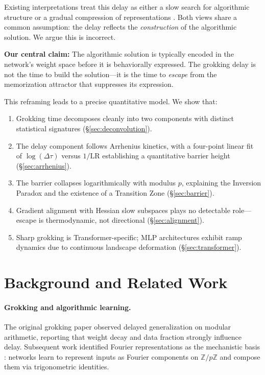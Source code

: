 \documentclass[11pt,twocolumn]{article}
\begin{document}
Existing interpretations treat this delay as either a slow search for algorithmic structure \citep{nanda2023progress} or a gradual compression of representations \citep{liu2022towards}. Both views share a common assumption: the delay reflects the \emph{construction} of the algorithmic solution. We argue this is incorrect.

\textbf{Our central claim:} The algorithmic solution is typically encoded in the network's weight space before it is behaviorally expressed. The grokking delay is not the time to build the solution---it is the time to \emph{escape} from the memorization attractor that suppresses its expression.

This reframing leads to a precise quantitative model. We show that:
\begin{enumerate}[leftmargin=*, itemsep=2pt]
\item Grokking time decomposes cleanly into two components with distinct statistical signatures (\S\ref{sec:deconvolution}).
\item The delay component follows Arrhenius kinetics, with a four-point linear fit of $\log(\Delta\tau)$ versus $1/\mathrm{LR}$ establishing a quantitative barrier height (\S\ref{sec:arrhenius}).
\item The barrier collapses logarithmically with modulus $p$, explaining the Inversion Paradox and the existence of a Transition Zone (\S\ref{sec:barrier}).
\item Gradient alignment with Hessian slow subspaces plays no detectable role---escape is thermodynamic, not directional (\S\ref{sec:alignment}).
\item Sharp grokking is Transformer-specific; MLP architectures exhibit ramp dynamics due to continuous landscape deformation (\S\ref{sec:transformer}).
\end{enumerate}

\section{Background and Related Work}

\paragraph{Grokking and algorithmic learning.}
The original grokking paper \citep{power2022grokking} observed delayed generalization on modular arithmetic, reporting that weight decay and data fraction strongly influence delay. Subsequent work identified Fourier representations as the mechanistic basis \citep{nanda2023progress}: networks learn to represent inputs as Fourier components on $\mathbb{Z}/p\mathbb{Z}$ and compose them via trigonometric identities.
\end{document}
